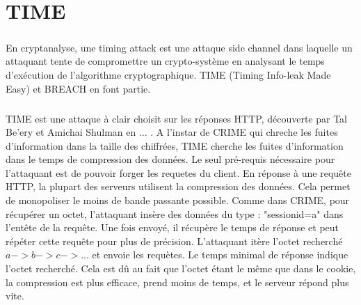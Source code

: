 \chapter{TIME}

\paragraph{}
En cryptanalyse, une timing attack est une attaque side channel dans laquelle un attaquant tente de compromettre un crypto-système en analysant le temps d'exécution de l'algorithme cryptographique. TIME (Timing Info-leak Made Easy) et BREACH en font partie.

\paragraph{}
TIME est une attaque à clair choisit sur les réponses HTTP, découverte par Tal Be'ery et Amichai Shulman en ... . A l'instar de CRIME qui chreche les fuites d'information dans la taille des chiffrées, TIME cherche les fuites d'information dans le temps de compression des données. Le seul pré-requis nécessaire pour l'attaquant est de pouvoir forger les requetes du client. 
En réponse à une requête HTTP, la plupart des serveurs utilisent la compression des données. Cela permet de monopoliser le moins de bande passante possible.
Comme dans CRIME, pour récupérer un octet, l'attaquant insère des données du type : "sessionid=a" dans l'entête de la requête. Une fois envoyé, il récupère le temps de réponse et peut répéter cette requête pour plus de précision. 
L'attaquant itère l'octet recherché \(a -> b -> c -> ...\) et envoie les requètes. Le temps minimal de réponse indique l'octet recherché. Cela est dû au fait que l'octet étant le même que dans le cookie, la compression est plus efficace, prend moins de temps, et le serveur répond plus vite.
